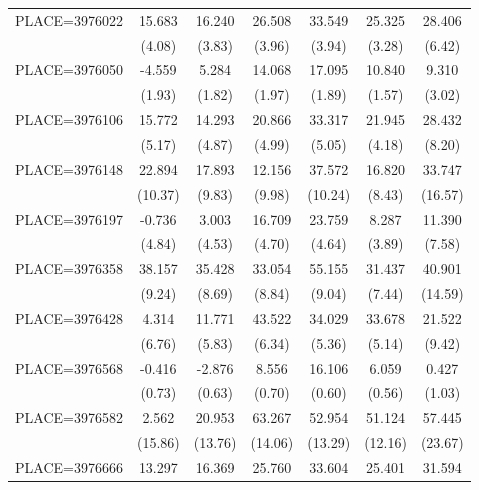 {\begin{tabular}{l*{6}{c}}
PLACE=3976022       &      15.683&      16.240&      26.508&      33.549&      25.325&      28.406\\
                    &      (4.08)&      (3.83)&      (3.96)&      (3.94)&      (3.28)&      (6.42)\\
PLACE=3976050       &      -4.559&       5.284&      14.068&      17.095&      10.840&       9.310\\
                    &      (1.93)&      (1.82)&      (1.97)&      (1.89)&      (1.57)&      (3.02)\\
PLACE=3976106       &      15.772&      14.293&      20.866&      33.317&      21.945&      28.432\\
                    &      (5.17)&      (4.87)&      (4.99)&      (5.05)&      (4.18)&      (8.20)\\
PLACE=3976148       &      22.894&      17.893&      12.156&      37.572&      16.820&      33.747\\
                    &     (10.37)&      (9.83)&      (9.98)&     (10.24)&      (8.43)&     (16.57)\\
PLACE=3976197       &      -0.736&       3.003&      16.709&      23.759&       8.287&      11.390\\
                    &      (4.84)&      (4.53)&      (4.70)&      (4.64)&      (3.89)&      (7.58)\\
PLACE=3976358       &      38.157&      35.428&      33.054&      55.155&      31.437&      40.901\\
                    &      (9.24)&      (8.69)&      (8.84)&      (9.04)&      (7.44)&     (14.59)\\
PLACE=3976428       &       4.314&      11.771&      43.522&      34.029&      33.678&      21.522\\
                    &      (6.76)&      (5.83)&      (6.34)&      (5.36)&      (5.14)&      (9.42)\\
PLACE=3976568       &      -0.416&      -2.876&       8.556&      16.106&       6.059&       0.427\\
                    &      (0.73)&      (0.63)&      (0.70)&      (0.60)&      (0.56)&      (1.03)\\
PLACE=3976582       &       2.562&      20.953&      63.267&      52.954&      51.124&      57.445\\
                    &     (15.86)&     (13.76)&     (14.06)&     (13.29)&     (12.16)&     (23.67)\\
PLACE=3976666       &      13.297&      16.369&      25.760&      33.604&      25.401&      31.594\\

\end{tabular}}
